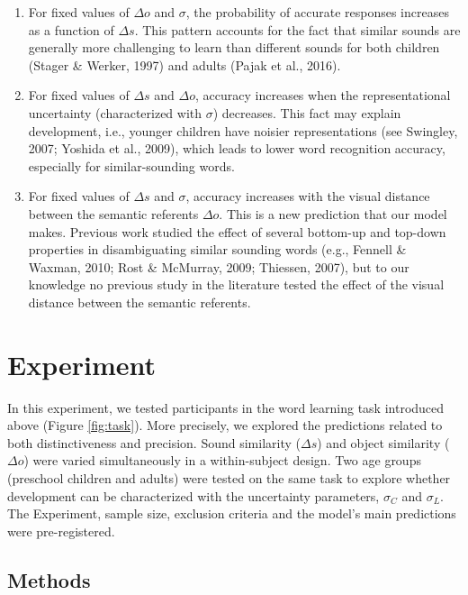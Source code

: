 \documentclass[10pt, letterpaper]{article}
\begin{document}
\begin{enumerate}
\def\labelenumi{\arabic{enumi})}
\item
  For fixed values of \(\Delta o\) and \(\sigma\), the probability of
  accurate responses increases as a function of \(\Delta s\). This
  pattern accounts for the fact that similar sounds are generally more
  challenging to learn than different sounds for both children (Stager
  \& Werker, 1997) and adults (Pajak et al., 2016).
\item
  For fixed values of \(\Delta s\) and \(\Delta o\), accuracy increases
  when the representational uncertainty (characterized with \(\sigma\))
  decreases. This fact may explain development, i.e., younger children
  have noisier representations (see Swingley, 2007; Yoshida et al.,
  2009), which leads to lower word recognition accuracy, especially for
  similar-sounding words.
\item
  For fixed values of \(\Delta s\) and \(\sigma\), accuracy increases
  with the visual distance between the semantic referents \(\Delta o\).
  This is a new prediction that our model makes. Previous work studied
  the effect of several bottom-up and top-down properties in
  disambiguating similar sounding words (e.g., Fennell \& Waxman, 2010;
  Rost \& McMurray, 2009; Thiessen, 2007), but to our knowledge no
  previous study in the literature tested the effect of the visual
  distance between the semantic referents.
\end{enumerate}

\section{Experiment}\label{experiment}

In this experiment, we tested participants in the word learning task
introduced above (Figure \ref{fig:task}). More precisely, we explored
the predictions related to both distinctiveness and precision. Sound
similarity (\(\Delta s\)) and object similarity (\(\Delta o\)) were
varied simultaneously in a within-subject design. Two age groups
(preschool children and adults) were tested on the same task to explore
whether development can be characterized with the uncertainty
parameters, \(\sigma_C\) and \(\sigma_L\). The Experiment, sample size,
exclusion criteria and the model's main predictions were pre-registered.

\subsection{Methods}\label{methods}
\end{document}
